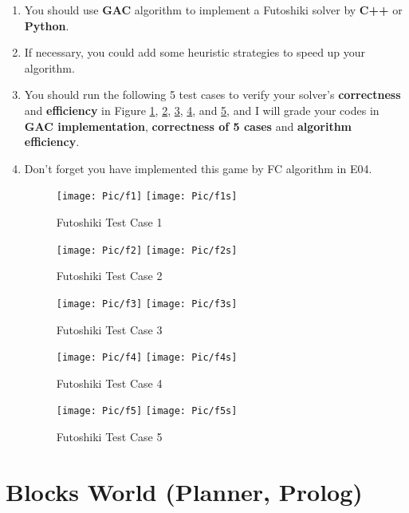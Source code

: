 ﻿\documentclass[a4paper, 11pt]{article}
\begin{document}
\begin{enumerate}
\item You should use \textbf{GAC} algorithm to implement a Futoshiki solver by \textbf{C++} or \textbf{Python}.
\item If necessary, you could add some heuristic strategies to speed up your algorithm. 
\item You should run the following 5 test cases to verify your solver's \textbf{correctness} and \textbf{efficiency} in Figure \ref{fig:case11}, \ref{fig:case22}, \ref{fig:case33}, \ref{fig:case44}, and \ref{fig:case55}, and I will grade your codes in \textbf{GAC implementation}, \textbf{correctness of 5 cases} and \textbf{algorithm efficiency}.
\item Don't forget you have implemented this game by FC algorithm in E04.
    \begin{figure}[htbp]
    \centering
    \texttt{[image: Pic/f1]}
    \qquad
    \texttt{[image: Pic/f1s]}
    \caption{Futoshiki Test Case 1}
    \label{fig:case11}
  \end{figure}
        \begin{figure}[htbp]
    \centering
    \texttt{[image: Pic/f2]}
    \qquad
    \texttt{[image: Pic/f2s]}
    \caption{Futoshiki Test Case 2}
    \label{fig:case22}
  \end{figure}
        \begin{figure}[htbp]
    \centering
    \texttt{[image: Pic/f3]}
    \qquad
    \texttt{[image: Pic/f3s]}
    \caption{Futoshiki Test Case 3}
    \label{fig:case33}
  \end{figure}
        \begin{figure}[htbp]
    \centering
    \texttt{[image: Pic/f4]}
    \qquad
    \texttt{[image: Pic/f4s]}
    \caption{Futoshiki Test Case 4}
    \label{fig:case44}
  \end{figure}
        \begin{figure}[htbp]
    \centering
    \texttt{[image: Pic/f5]}
    \qquad
    \texttt{[image: Pic/f5s]}
    \caption{Futoshiki Test Case 5}
    \label{fig:case55}
  \end{figure}

\end{enumerate}

\section{Blocks World (Planner, Prolog)}
\end{document}
